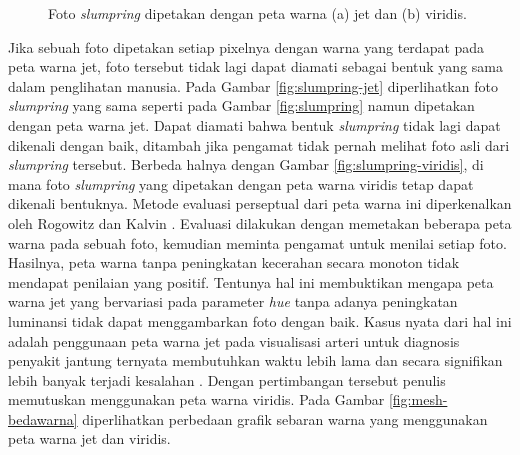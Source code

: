 \begin{figure}[t!]
	\centering
	\hspace{1cm}
	\caption{Foto \emph{slumpring} dipetakan dengan peta warna (a) jet dan (b) viridis.}
	\label{fig:slumpring-warna}
\end{figure}

Jika sebuah foto dipetakan setiap pixelnya dengan warna yang terdapat pada peta warna jet, foto tersebut tidak lagi dapat diamati sebagai bentuk yang sama dalam penglihatan manusia. Pada Gambar \ref{fig:slumpring-jet} diperlihatkan foto \emph{slumpring} yang sama seperti pada Gambar \ref{fig:slumpring} namun dipetakan dengan peta warna jet. Dapat diamati bahwa bentuk \emph{slumpring} tidak lagi dapat dikenali dengan baik, ditambah jika pengamat tidak pernah melihat foto asli dari \emph{slumpring} tersebut. Berbeda halnya dengan Gambar \ref{fig:slumpring-viridis}, di mana foto \emph{slumpring} yang dipetakan dengan peta warna viridis tetap dapat dikenali bentuknya. Metode evaluasi perseptual dari peta warna ini diperkenalkan oleh Rogowitz dan Kalvin \cite{prosiding-cmap}. Evaluasi dilakukan dengan memetakan beberapa peta warna pada sebuah foto, kemudian meminta pengamat untuk menilai setiap foto. Hasilnya, peta warna tanpa peningkatan kecerahan secara monoton tidak mendapat penilaian yang positif. Tentunya hal ini membuktikan mengapa peta warna jet yang bervariasi pada parameter \emph{hue} tanpa adanya peningkatan luminansi tidak dapat menggambarkan foto dengan baik. Kasus nyata dari hal ini adalah penggunaan peta warna jet pada visualisasi arteri untuk diagnosis penyakit jantung ternyata membutuhkan waktu lebih lama dan secara signifikan lebih banyak terjadi kesalahan \cite{arteri-cmap}. Dengan pertimbangan tersebut penulis memutuskan menggunakan peta warna viridis. Pada Gambar \ref{fig:mesh-bedawarna} diperlihatkan perbedaan grafik sebaran warna yang menggunakan peta warna jet dan viridis. \par 

